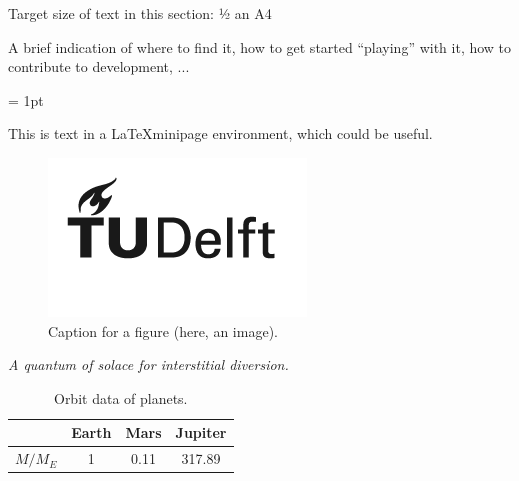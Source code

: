 \lbrack Target size of text in this section: ½ an A4\rbrack

A brief indication of where to find it, how to get started ``playing'' with it, how to contribute to development, ...

\fboxrule = 1pt


\begin{center}
    \begin{minipage}[tc]{30mm}
        This is text in a \LaTeX minipage environment, which could be useful.
    \end{minipage}
\end{center}

\begin{center}
    \begin{figure}[!h]
                \includegraphics[width=.5\linewidth]{tudelft_logo_black_2022.png}
        \caption[]{Caption for a figure (here, an image).}
    \end{figure}
\end{center}
\lbrack \emph{A quantum of solace for interstitial diversion.}\rbrack
    \begin{table}[!h]
        \caption{Orbit data of planets.}
        \label{tab:orbit_data_planets} \centering
        \begin{tabular}[]{lccc}
            \toprule
            \phantom{sun} & Earth & Mars & Jupiter \\ \midrule
            $M/M_E$       & 1     & 0.11 & 317.89  \\ \bottomrule
        \end{tabular}
    \end{table}
